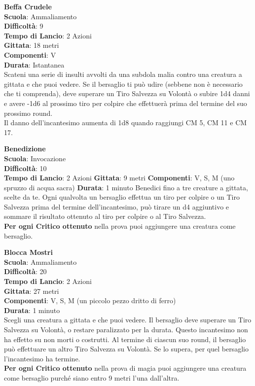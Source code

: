 \begin{multicols}{2}
\medskip\textbf{Beffa Crudele}\\
\textbf{Scuola}: Ammaliamento\\
\textbf{Difficoltà}:  9\\
\textbf{Tempo di Lancio}: 2 Azioni\\
\textbf{Gittata}: 18 metri\\
\textbf{Componenti}: V\\
\textbf{Durata}: Istantanea\\
Scateni una serie di insulti avvolti da una subdola malia contro una creatura a gittata e che puoi vedere. Se il bersaglio ti può udire (sebbene non è necessario che ti comprenda), deve superare un Tiro Salvezza su Volontà o subire 1d4 danni e avere -1d6 al prossimo tiro per colpire che effettuerà prima del termine del suo prossimo round.\\
Il danno dell'incantesimo aumenta di 1d8 quando raggiungi CM 5, CM 11 e CM 17.

\medskip\textbf{Benedizione}\\
\textbf{Scuola}: Invocazione\\
\textbf{Difficoltà}:  10\\
\textbf{Tempo di Lancio}: 2 Azioni
\textbf{Gittata}: 9 metri
\textbf{Componenti}: V, S, M (uno spruzzo di acqua sacra)
\textbf{Durata}: 1 minuto
Benedici fino a tre creature a gittata, scelte da te. Ogni qualvolta un bersaglio effettua un tiro per colpire o un Tiro Salvezza prima del termine dell'incantesimo, può tirare un d4 aggiuntivo e sommare il risultato ottenuto al tiro per colpire o al Tiro Salvezza.\\
\textbf{Per ogni Critico ottenuto} nella prova puoi aggiungere una creatura come bersaglio.

\medskip\textbf{Blocca Mostri}\\
\textbf{Scuola}: Ammaliamento\\
\textbf{Difficoltà}:  20\\
\textbf{Tempo di Lancio}: 2 Azioni\\
\textbf{Gittata}: 27 metri\\
\textbf{Componenti}: V, S, M (un piccolo pezzo dritto di ferro)\\
\textbf{Durata}: 1 minuto\\
Scegli una creatura a gittata e che puoi vedere. Il bersaglio deve superare un Tiro Salvezza su Volontà, o restare paralizzato per la durata. Questo incantesimo non ha effetto su non morti o costrutti. Al termine di ciascun suo round, il bersaglio può effettuare un altro Tiro Salvezza su Volontà. Se lo supera, per quel bersaglio l'incantesimo ha termine.\\
\textbf{Per ogni Critico ottenuto} nella prova di magia puoi aggiungere una creatura come bersaglio purché siano entro 9 metri l’una dall'altra.



\end{multicols}

